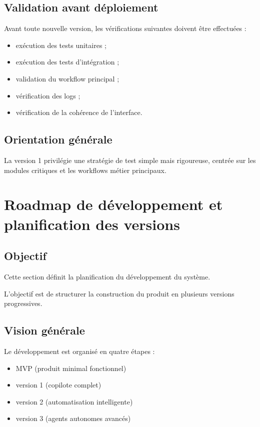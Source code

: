 \documentclass[11pt,a4paper]{article}
\begin{document}
\subsection{Validation avant déploiement}

Avant toute nouvelle version, les vérifications suivantes doivent être effectuées :

\begin{itemize}
    \item exécution des tests unitaires ;
    \item exécution des tests d’intégration ;
    \item validation du workflow principal ;
    \item vérification des logs ;
    \item vérification de la cohérence de l’interface.
\end{itemize}

\subsection{Orientation générale}

La version 1 privilégie une stratégie de test simple mais rigoureuse, centrée sur les modules critiques et les workflows métier principaux.

\section{Roadmap de développement et planification des versions}

\subsection{Objectif}

Cette section définit la planification du développement du système.

L’objectif est de structurer la construction du produit en plusieurs versions progressives.

\subsection{Vision générale}

Le développement est organisé en quatre étapes :

\begin{itemize}
\item MVP (produit minimal fonctionnel)
\item version 1 (copilote complet)
\item version 2 (automatisation intelligente)
\item version 3 (agents autonomes avancés)
\end{itemize}
\end{document}
